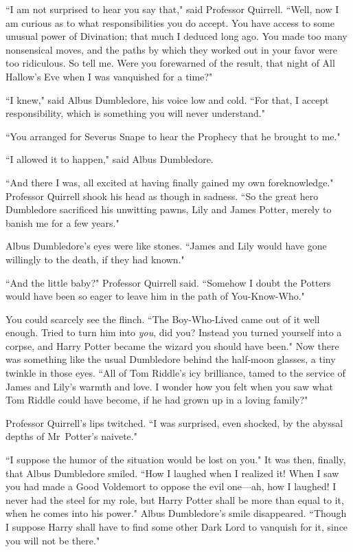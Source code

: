 ``I am not surprised to hear you say that," said Professor Quirrell. ``Well, now I am curious as to what responsibilities you do accept. You have access to some unusual power of Divination; that much I deduced long ago. You made too many nonsensical moves, and the paths by which they worked out in your favor were too ridiculous. So tell me. Were you forewarned of the result, that night of All Hallow's Eve when I was vanquished for a time?"

``I knew," said Albus Dumbledore, his voice low and cold. ``For that, I accept responsibility, which is something you will never understand."

``You arranged for Severus Snape to hear the Prophecy that he brought to me."

``I allowed it to happen," said Albus Dumbledore.

``And there I was, all excited at having finally gained my own foreknowledge." Professor Quirrell shook his head as though in sadness. ``So the great hero Dumbledore sacrificed his unwitting pawns, Lily and James Potter, merely to banish me for a few years."

Albus Dumbledore's eyes were like stones. ``James and Lily would have gone willingly to the death, if they had known."

``And the little baby?" Professor Quirrell said. ``Somehow I doubt the Potters would have been so eager to leave him in the path of You-Know-Who."

You could scarcely see the flinch. ``The Boy-Who-Lived came out of it well enough. Tried to turn him into \emph{you}, did you? Instead you turned yourself into a corpse, and Harry Potter became the wizard you should have been." Now there was something like the usual Dumbledore behind the half-moon glasses, a tiny twinkle in those eyes. ``All of Tom Riddle's icy brilliance, tamed to the service of James and Lily's warmth and love. I wonder how you felt when you saw what Tom Riddle could have become, if he had grown up in a loving family?"

Professor Quirrell's lips twitched. ``I was surprised, even shocked, by the abyssal depths of Mr~Potter's naivete."

``I suppose the humor of the situation would be lost on you." It was then, finally, that Albus Dumbledore smiled. ``How I laughed when I realized it! When I saw you had made a Good Voldemort to oppose the evil one—ah, how I laughed! I never had the steel for my role, but Harry Potter shall be more than equal to it, when he comes into his power." Albus Dumbledore's smile disappeared. ``Though I suppose Harry shall have to find some other Dark Lord to vanquish for it, since you will not be there."

